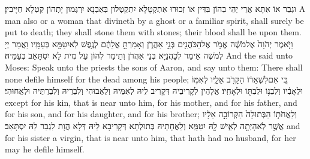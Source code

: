 {וּגְבַר אוֹ אִתָּא אֲרֵי יְהֵי בְהוֹן בִּדִּין אוֹ זְכוּרוּ אִתְקְטָלָא יִתְקַטְלוּן בְּאַבְנָא יִרְגְּמוּן יָתְהוֹן קַטְלָא חַיָּיבִין׃}
{A man also or a woman that divineth by a ghost or a familiar spirit, shall surely be put to death; they shall stone them with stones; their blood shall be upon them.}{}
\newperek
{}
{וַיֹּ֤אמֶר יְהֹוָה֙ אֶל\maqqaf מֹשֶׁ֔ה אֱמֹ֥ר אֶל\maqqaf הַכֹּהֲנִ֖ים בְּנֵ֣י אַהֲרֹ֑ן וְאָמַרְתָּ֣ אֲלֵהֶ֔ם לְנֶ֥פֶשׁ לֹֽא\maqqaf יִטַּמָּ֖א בְּעַמָּֽיו׃}
{וַאֲמַר יְיָ לְמֹשֶׁה אֵימַר לְכָהֲנַיָּא בְּנֵי אַהֲרֹן וְתֵימַר לְהוֹן עַל מִית לָא יִסְתָּאַב בְּעַמֵּיהּ׃}
{And the \lord\space said unto Moses: Speak unto the priests the sons of Aaron, and say unto them: There shall none defile himself for the dead among his people;}{}
{כִּ֚י אִם\maqqaf לִשְׁאֵר֔וֹ הַקָּרֹ֖ב אֵלָ֑יו לְאִמּ֣וֹ וּלְאָבִ֔יו וְלִבְנ֥וֹ וּלְבִתּ֖וֹ וּלְאָחִֽיו׃}
{אֱלָהֵין לְקָרִיבֵיהּ דְּקָרִיב לֵיהּ לְאִמֵּיהּ וְלַאֲבוּהִי וְלִבְרֵיהּ וְלִבְרַתֵּיהּ וּלְאֲחוּהִי׃}
{except for his kin, that is near unto him, for his mother, and for his father, and for his son, and for his daughter, and for his brother;}{}
{וְלַאֲחֹת֤וֹ הַבְּתוּלָה֙ הַקְּרוֹבָ֣ה אֵלָ֔יו אֲשֶׁ֥ר לֹֽא\maqqaf הָיְתָ֖ה לְאִ֑ישׁ לָ֖הּ יִטַּמָּֽא׃}
{וְלַאֲחָתֵיהּ בְּתוּלְתָא דְּקָרִיבָא לֵיהּ דְּלָא הֲוָת לִגְבַר לַהּ יִסְתָּאַב׃}
{and for his sister a virgin, that is near unto him, that hath had no husband, for her may he defile himself.}{}
